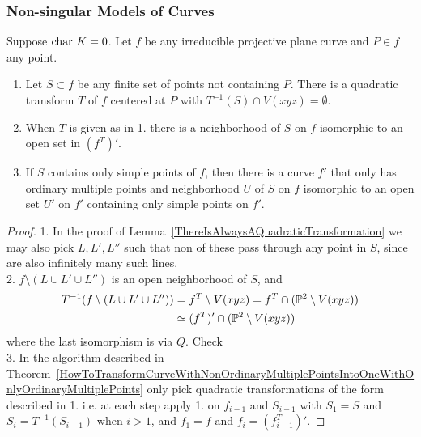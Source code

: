     \subsubsection{Non-singular Models of Curves}
    \begin{lemma}\label{TechnicalNonsingularModelLemma}
        Suppose $\mathrm{char}\ K =0$. Let $f$ be any irreducible projective plane curve and $P\in f$ any point. 
        \begin{enumerate}
            \item Let $S\subset f$ be any finite set of points not containing $P$. There is a quadratic transform $T$ of $f$ centered at $P$ with $T^{-1}(S)\cap V(xyz)=\emptyset$.
            \item When $T$ is given as in 1. there is a neighborhood of $S$ on $f$ isomorphic to an open set in $(f^T)'$.
            \item If $S$ contains only simple points of $f$, then there is a curve $f'$ that only has ordinary multiple points and neighborhood $U$ of $S$ on $f$ isomorphic to an open set $U'$ on $f'$ containing only simple points on $f'$. 
        \end{enumerate}
    \end{lemma}
    \begin{proof}
        1. In the proof of Lemma~\ref{ThereIsAlwaysAQuadraticTransformation} we may also pick $L,L',L''$ such that non of these pass through any point in $S$, since are also infinitely many such lines.\\
        2. $f\setminus(L\cup L'\cup L'')$ is an open neighborhood of $S$, and  
        \begin{align*}
            T^{-1}(f\setminus (L\cup L'\cup L'')) &= f^T\setminus V(xyz) = f^T \cap (\mathbb{P}^2\setminus V(xyz))\\
            &\simeq (f^T)' \cap (\mathbb{P}^2\setminus V(xyz))
        \end{align*} 
        where the last isomorphism is via $Q$. {\Large Check}\\ 
        3. In the algorithm described in Theorem~\ref{HowToTransformCurveWithNonOrdinaryMultiplePointsIntoOneWithOnlyOrdinaryMultiplePoints} only pick quadratic transformations of the form described in 1. i.e. at each step apply 1. on $f_{i-1}$ and $S_{i-1}$ with $S_1=S$ and $S_i=T^{-1}(S_{i-1})$ when $i>1$, and $f_1=f$ and $f_i = (f_{i-1}^T)'$.
    \end{proof}
